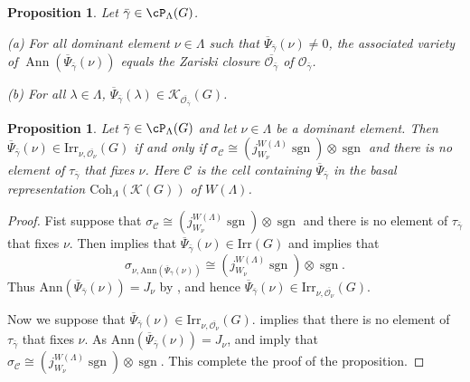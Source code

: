 \documentclass[12pt,a4paper]{amsart}
\newcommand{\CC}{{\mathcal {C}}}
\newcommand{\CK}{{\mathcal {K}}}
\newcommand{\CO}{{\mathcal {O}}}
\DeclareMathOperator{\Ann}{Ann}
\newcommand{\sgn}{\operatorname{sgn}}
\numberwithin{equation}{section}
\newtheorem{prop}[thm]{Proposition}
\theoremstyle{remark}
\def\Irr{\mathrm{Irr}}
\def\Coh{\mathrm{Coh}}
\begin{document}
\begin{prop}\label{asshc00}
Let  $\bar \gamma \in \cP_\Lambda(G)$.

\noindent (a)
 For all  dominant element $\nu\in \Lambda$ such that $\overline{\Psi}_{\bar \gamma}(\nu)\neq 0$, the associated variety of $\Ann(\overline \Psi_{\bar \gamma}(\nu))$ equals the Zariski closure $\overline{\CO_{\bar \gamma}}$ of $\CO_{\bar \gamma}$.

\noindent (b)
For all $\lambda\in \Lambda$, $\overline{\Psi}_{\bar \gamma}(\lambda)\in \CK_{\overline{\CO_{\bar \gamma}}}(G)$.


\end{prop}





\begin{prop}\label{hcass222}
Let $\bar \gamma\in \cP_\Lambda(G)$ and let $\nu\in \Lambda$ be a dominant element. Then $\overline \Psi_{\bar \gamma}(\nu)\in \Irr_{\nu, \overline{\CO_\nu}}(G)$ if and only if $\sigma_\CC\cong \left( j_{W_\nu}^{W(\Lambda)} \sgn\right)\otimes \sgn $ and there is no element of   $ \tau_{\bar\gamma}$  that fixes $\nu$.  Here $\CC$ is the cell containing  $\overline \Psi_{\bar \gamma}$ in the basal  representation  $\Coh_{\Lambda}(\CK(G))$ of $W(\Lambda)$.


\end{prop}
\begin{proof}
Fist suppose that $\sigma_\CC\cong \left( j_{W_\nu}^{W(\Lambda)} \sgn\right)\otimes \sgn$ and there is no element of   $ \tau_{\bar\gamma}$  that fixes $\nu$.
Then  implies that $\overline \Psi_{\bar \gamma}(\nu)\in \Irr(G)$ and   implies that
\[
\sigma_{\nu, \mathrm{Ann}(\overline{\Psi}_{\bar \gamma}(\nu))}\cong  \left( j_{W_\nu}^{W(\Lambda)} \sgn\right)\otimes \sgn.
\]
Thus $ \mathrm{Ann}(\overline{\Psi}_{\bar \gamma}(\nu))=J_\nu$ by , and hence $\overline \Psi_{\bar \gamma}(\nu)\in \Irr_{\nu, \overline{\CO_\nu}}(G)$.

Now we suppose that $\overline \Psi_{\bar \gamma}(\nu)\in \Irr_{\nu, \overline{\CO_\nu}}(G)$.  implies that there is no element of   $ \tau_{\bar\gamma}$  that fixes $\nu$.
As $ \mathrm{Ann}(\overline{\Psi}_{\bar \gamma}(\nu))=J_\nu$,  and   imply that $\sigma_\CC\cong \left( j_{W_\nu}^{W(\Lambda)} \sgn\right)\otimes \sgn$. This complete the proof of the proposition.

\end{proof}
\end{document}

